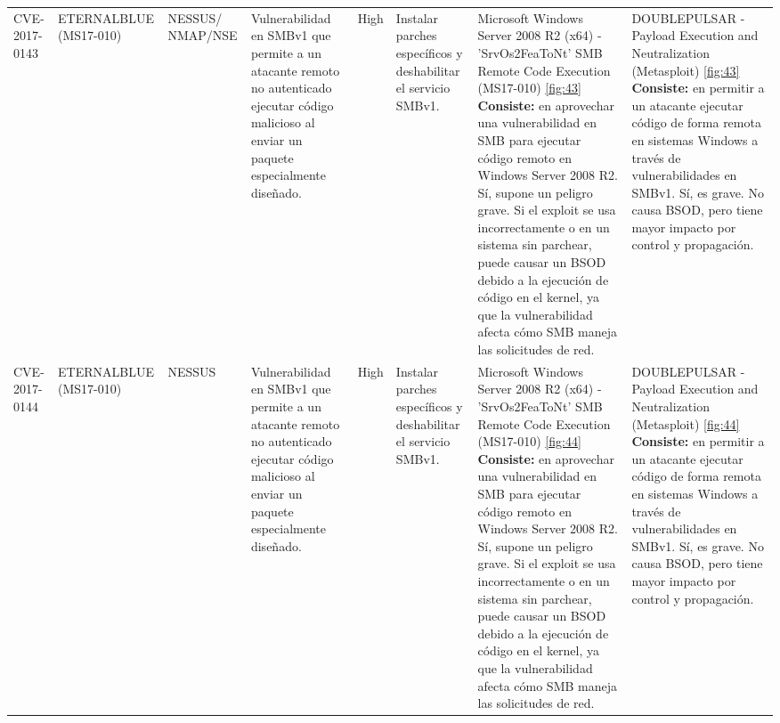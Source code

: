 \documentclass[a4paper,12pt]{article} %
\begin{document}
\begin{table}[hp!]
{\begin{tabular}{m{2.1cm}|m{2.6cm}|m{2cm}|m{4cm}|m{1cm}|m{3cm}|m{5cm}|m{5cm}}
  {CVE-2017-0143} & {ETERNALBLUE (MS17-010)} & {NESSUS/ NMAP/NSE} & {Vulnerabilidad en SMBv1 que permite a un atacante remoto no autenticado ejecutar código malicioso al enviar un paquete especialmente diseñado.} & {High} & {Instalar parches específicos y deshabilitar el servicio SMBv1.} & { Microsoft Windows Server 2008 R2 (x64) - 'SrvOs2FeaToNt' SMB Remote Code Execution (MS17-010)  \ref{fig:43} \vspace{2mm} \hline \vspace{2mm} {\color{blue} \textbf{Consiste:} en aprovechar una vulnerabilidad en SMB para ejecutar código remoto en Windows Server 2008 R2. } \vspace{2mm} \hline \vspace{2mm} {\color{red} Sí, supone un peligro grave. Si el exploit se usa incorrectamente o en un sistema sin parchear, puede causar un BSOD debido a la ejecución de código en el kernel, ya que la vulnerabilidad afecta cómo SMB maneja las solicitudes de red. }} & {DOUBLEPULSAR - Payload Execution and Neutralization (Metasploit) \ref{fig:43}  \vspace{2mm} \hline \vspace{2mm} {\color{blue} \textbf{Consiste:} en permitir a un atacante ejecutar código de forma remota en sistemas Windows a través de vulnerabilidades en SMBv1.} \vspace{2mm} \hline \vspace{2mm} {\color{red} Sí, es grave. No causa BSOD, pero tiene mayor impacto por control y propagación.}}\\
  {CVE-2017-0144} & {ETERNALBLUE (MS17-010)} & {NESSUS} & {Vulnerabilidad en SMBv1 que permite a un atacante remoto no autenticado ejecutar código malicioso al enviar un paquete especialmente diseñado.} & {High} & {Instalar parches específicos y deshabilitar el servicio SMBv1.} & { Microsoft Windows Server 2008 R2 (x64) - 'SrvOs2FeaToNt' SMB Remote Code Execution (MS17-010) \ref{fig:44} \vspace{2mm} \hline \vspace{2mm} {\color{blue} \textbf{Consiste:} en aprovechar una vulnerabilidad en SMB para ejecutar código remoto en Windows Server 2008 R2.} \vspace{2mm} \hline \vspace{2mm} {\color{red} Sí, supone un peligro grave. Si el exploit se usa incorrectamente o en un sistema sin parchear, puede causar un BSOD debido a la ejecución de código en el kernel, ya que la vulnerabilidad afecta cómo SMB maneja las solicitudes de red.}} & {DOUBLEPULSAR - Payload Execution and Neutralization (Metasploit) \ref{fig:44}   \vspace{2mm} \hline \vspace{2mm} {\color{blue} \textbf{Consiste:} en permitir a un atacante ejecutar código de forma remota en sistemas Windows a través de vulnerabilidades en SMBv1.}  \vspace{2mm} \hline \vspace{2mm} {\color{red} Sí, es grave. No causa BSOD, pero tiene mayor impacto por control y propagación.}}\\

\end{tabular}}
\end{table}
\end{document}
